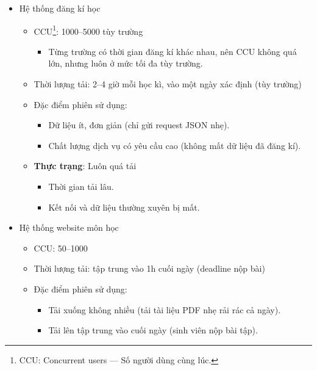 \documentclass{article}
\begin{document}
\begin{itemize}
    \item Hệ thống đăng kí học
        \begin{itemize}
            \item CCU\footnote{CCU\@: Concurrent users --- Số người dùng cùng
                lúc.}: 1000--5000 tùy trường
                \begin{itemize}
                    \item Từng trường có thời gian đăng kí khác nhau, nên CCU
                        không quá lớn, nhưng luôn ở mức tối đa tùy trường.
                \end{itemize}
            \item Thời lượng tải: 2--4 giờ mỗi học kì, vào một ngày xác định
                (tùy trường)
            \item Đặc điểm phiên sử dụng:
                \begin{itemize}
                    \item Dữ liệu ít, đơn giản (chỉ gửi request JSON nhẹ).
                    \item Chất lượng dịch vụ có yêu cầu cao (không mất dữ liệu
                        đã đăng kí).
                \end{itemize}
            \item \textbf{Thực trạng}: Luôn quá tải
                \begin{itemize}
                    \item Thời gian tải lâu.
                    \item Kết nối và dữ liệu thường xuyên bị mất.
                \end{itemize}
        \end{itemize}
    \item Hệ thống website môn học
        \begin{itemize}
            \item CCU\@: 50--1000
            \item Thời lượng tải: tập trung vào 1h cuối ngày (deadline nộp bài)
            \item Đặc điểm phiên sử dụng:
                \begin{itemize}
                    \item Tải xuống không nhiều (tải tài liệu PDF nhẹ rải rác cả
                        ngày).
                    \item Tải lên tập trung vào cuối ngày (sinh viên nộp bài
                        tập).

\end{itemize}
\end{itemize}
\end{itemize}
\end{document}
